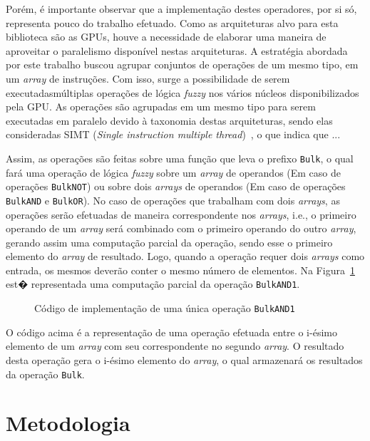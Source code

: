 \documentclass[12pt]{article}
\begin{document}
{Porém, é importante observar que a implementação destes operadores, por si só, representa pouco do trabalho efetuado. Como as arquiteturas alvo para esta biblioteca são as GPUs, houve a necessidade de elaborar uma maneira de aproveitar o paralelismo disponível nestas arquiteturas. A estratégia abordada por este trabalho buscou agrupar conjuntos de operações de um mesmo tipo, em um \textit{array} de instruções. Com isso, surge a possibilidade de serem executadasmúltiplas operações de lógica \textit{fuzzy} nos vários núcleos disponibilizados pela GPU. As operações são agrupadas em um mesmo tipo para serem executadas em paralelo devido à taxonomia destas arquiteturas, sendo elas consideradas SIMT (\textit{Single instruction multiple thread})~\cite{keckler:11}, o que indica que ...

Assim, as operações são feitas sobre uma função que leva o prefixo \texttt{Bulk}, o qual fará uma operação de lógica \textit{fuzzy} sobre um \textit{array} de operandos (Em caso de operações \texttt{BulkNOT}) ou sobre dois \textit{arrays} de operandos (Em caso de operações \texttt{BulkAND} e \texttt{BulkOR}). No caso de operações que trabalham com dois \textit{arrays}, as operações serão efetuadas de maneira correspondente nos \textit{arrays}, i.e., o primeiro operando de um \textit{array} será combinado com o primeiro operando do outro \textit{array}, gerando assim uma computação parcial da operação, sendo esse o primeiro elemento do \textit{array} de resultado. Logo, quando a operação requer dois \textit{arrays} como entrada, os mesmos deverão conter o mesmo número de elementos. Na Figura~\ref{fig:bulkoperation} est� representada uma computação parcial da operação \texttt{BulkAND1}.

\begin{figure}[!h]
\centering

\caption{Código de implementação de uma única operação \texttt{BulkAND1}}
\label{fig:bulkoperation}
\end{figure}

O código acima é a representação de uma operação efetuada entre o i-ésimo elemento de um \textit{array} com seu correspondente no segundo \textit{array}. O resultado desta operação gera o i-ésimo elemento do \textit{array}, o qual armazenará os resultados da operação \texttt{Bulk}.

\section{Metodologia}
\label{sec:metodologia}	

}
\end{document}
